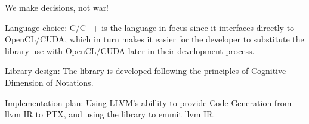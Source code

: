 We make decisions, not war!

Language choice:
C/C++ is the language in focus since it interfaces directly to OpenCL/CUDA, which in turn makes it easier for the developer to substitute the library use with OpenCL/CUDA later in their development process. 

Library design:
The library is developed following the principles of Cognitive Dimension of Notations. 

Implementation plan:
Using LLVM’s abillity to provide Code Generation from llvm IR to PTX, and using the library to emmit llvm IR.